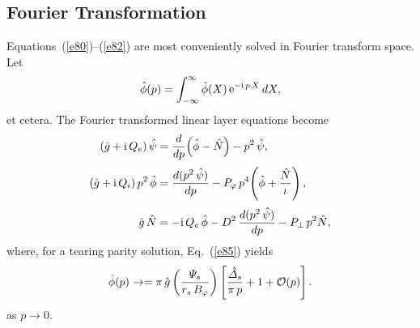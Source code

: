 \documentclass[12pt,prb,aps,notitlepage]{revtex4-1}
\begin{document}
\subsection{Fourier Transformation}\label{ft}
Equations~(\ref{e80})--(\ref{e82}) are most conveniently solved in Fourier transform space.\cite{err2} 
Let
\begin{equation}\label{e86a}
\hat{\phi}(p) = \int_{-\infty}^\infty \tilde{\phi}(X)\,{\rm e}^{-{\rm i}\,p\,X}\,dX,
\end{equation}
et cetera. The Fourier transformed linear layer equations become
\begin{align}\label{e314}
(\hat{g}+{\rm i}\,Q_e)\,\hat{\psi}&=\frac{d}{d p}\!\left(\hat{\phi}-\hat{N}\right)-p^2\,\hat{\psi},\\[0.5ex]
(\hat{g}+{\rm i}\,Q_i)\,p^2\,\hat{\phi}&=  \frac{d (p^2\,\hat{\psi})}{d p}- P_\varphi\,p^4\!\left(\hat{\phi} + \frac{\hat{N}}{\iota}\right),\\[0.5ex]
\hat{g}\,\hat{N} &= - {\rm i}\,Q_{e}\,\hat{\phi} -D^{2}\,\frac{d (p^2\,\hat{\psi})}{d p}
  - P_\perp\,p^2\hat{N},\label{e316}
\end{align}
where, for a tearing parity solution, Eq.~(\ref{e85}) yields\,\cite{ed}
\begin{equation}\label{e94}
\hat{\phi}(p)\rightarrow =\pi\,\hat{g}\left(\frac{{\mit\Psi}_s}{r_s\,B_\varphi}\right)\left[\frac{\hat{\mit\Delta}_s}{\pi\,p} + 1+ {\cal O}(p)\right].
\end{equation}
as $p\rightarrow 0$. 
\end{document}
